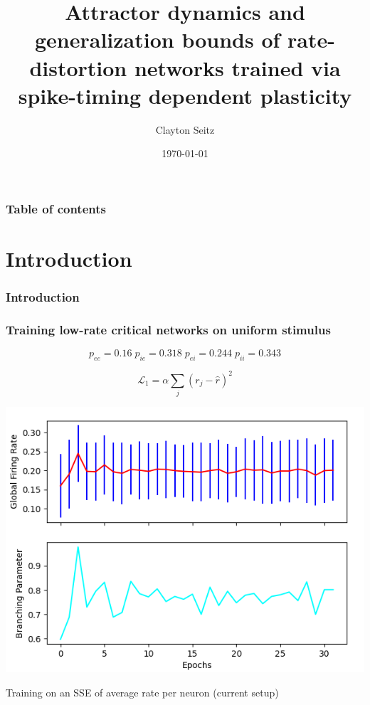\documentclass{beamer}
\begin{document}
\title{Attractor dynamics and generalization bounds of rate-distortion networks trained via spike-timing dependent plasticity}  
\author{Clayton Seitz}
\date{\today} 

\begin{frame}[plain]
\titlepage
\end{frame}

\begin{frame}[plain]\frametitle{Table of contents}\tableofcontents
\end{frame} 

\section{Introduction} 

\begin{frame}[plain]
\frametitle{Introduction} 

\end{frame}

\begin{frame}[plain]
\frametitle{Training low-rate critical networks on uniform stimulus} 

\begin{equation*}
p_{ee} = 0.16 \; p_{ie} = 0.318 \;  p_{ei} = 0.244 \; p_{ii} = 0.343
\end{equation*}

\begin{equation*}
\mathcal{L}_{1} = \alpha \sum_{j} (r_{j} - \hat{r})^{2}
\end{equation*}

\begin{center}
\includegraphics[scale=0.5]{sse-vars}
\end{center}

Training on an SSE of average rate per neuron (current setup)

\end{frame}
\end{document}

